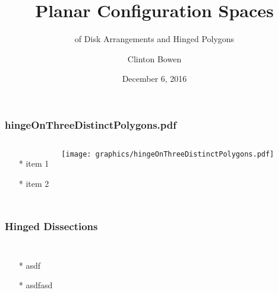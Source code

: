 \documentclass{beamer}
\title[Planar Configuration Spaces]{Planar Configuration Spaces }
\subtitle{of Disk Arrangements and Hinged Polygons}
\author{Clinton Bowen}
\institute
{
  Cal State Northridge
}
\date
{December 6, 2016}
\begin{document}
\frame{\titlepage}
\begin{frame} \frametitle{hingeOnThreeDistinctPolygons.pdf}
    \begin{columns}[c]
        \begin{itemize}
            \item[*] item 1
            \item[*] item 2
        \end{itemize}
        \begin{minipage}{\linewidth}
            \begin{center}
            \texttt{[image: graphics/hingeOnThreeDistinctPolygons.pdf]}
            \label{gfx:hingeOnThreeDistinctPolygons.pdf}
            \end{center}
        \end{minipage}
    \end{columns}
\end{frame}
\begin{frame}\frametitle{Hinged Dissections}
   \begin{columns}[c] 
   \begin{itemize}
    \item[*] asdf
    \item[*] asdfasd
   \end{itemize}
  \begin{minipage}{\linewidth}
    \begin{center}
    \end{center}
  \end{minipage}
  \end{columns}
\end{frame}
\end{document}
